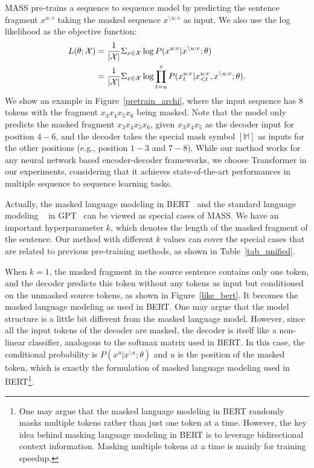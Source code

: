 \documentclass{article}
\begin{document}
	MASS pre-trains a sequence to sequence model by predicting the sentence fragment $x^{u:v}$ taking the masked sequence $x^{\setminus u:v}$ as input. We also use the log likelihood as the objective function:
	\begin{equation}
	\begin{aligned}
	\small
	\label{equ_bt}
	L(\theta; \mathcal{X}) 
	& = \frac{1}{|\mathcal{X}|}\Sigma_{x \in \mathcal{X}}\log P(x^{u:v}|x^{\setminus u:v};\theta) \\
	& = \frac{1}{|\mathcal{X}|}\Sigma_{x \in \mathcal{X}}\log \prod_{t=u}^{v} P(x^{u:v}_t | x^{u:v}_{<t}, x^{\setminus u:v}; \theta). \\
	\end{aligned}
	\end{equation}
	We show an example in Figure~\ref{pretrain_archi}, where the input sequence has 8 tokens with the fragment $x_3x_4x_5x_6$ being masked. Note that the model only predicts the masked fragment $x_3x_4x_5x_6$, given $x_3x_4x_5$ as the decoder input for position $4-6$, and the decoder takes the special mask symbol $[\mathbb{M}]$ as inputs for the other positions (e.g., position $1-3$ and $7-8$). While our method works for any neural network based encoder-decoder frameworks, we choose Transformer in our experiments, considering that it achieves state-of-the-art performances in multiple sequence to sequence learning tasks.
	
	Actually, the masked language modeling in BERT~\citep{devlin2018bert} and the standard language modeling
	~\citep{bengio2003neural,mikolov2010recurrent} in GPT~\citep{radford2018improving} can be viewed as special cases of MASS. We have an important hyperparameter $k$, which denotes the length of the masked fragment of the sentence. Our method with different $k$ values can cover the special cases that are related to previous pre-training methods, as shown in Table~\ref{tab_unified}.
	
	When $k=1$, the masked fragment in the source sentence contains only one token, and the decoder predicts this token without any tokens as input but conditioned on the unmasked source tokens, as shown in Figure~\ref{like_bert}. It becomes the masked language modeling as used in BERT. One may argue that the model structure is a little bit different from the masked language model. However, since all the input tokens of the decoder are masked, the decoder is itself like a non-linear classifier, analogous to the softmax matrix used in BERT. In this case, the conditional probability is $P(x^{u}|x^{\setminus u};\theta)$ and $u$ is the position of the masked token, which is exactly the formulation of masked language modeling used in BERT\footnote{One may argue that the masked language modeling in BERT randomly masks multiple tokens rather than just one token at a time. However, the key idea behind masking language modeling in BERT is to leverage bidirectional context information. Masking multiple tokens at a time is mainly for training speedup.}.
	
\end{document}
